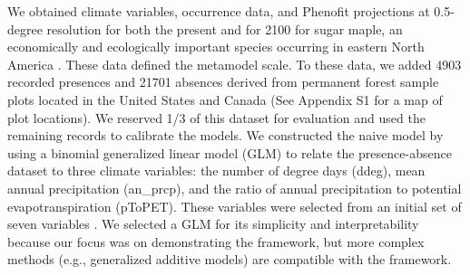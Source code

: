 \documentclass[11pt]{article}
\newcommand{\rev}[1]{{\color{RoyalBlue}#1}}
\begin{document}
We obtained climate variables, occurrence data, and Phenofit projections at 0.5-degree resolution for both the present and for \rev{2100} for sugar maple, an economically and ecologically important species occurring in eastern North America \citep{Morin2009}.
These data defined the metamodel scale.
To these data, we added 4903 recorded presences and 21701 absences derived from permanent forest sample plots located in the United States and Canada (See Appendix S1 for a map of plot locations).
We reserved 1/3 of this dataset for evaluation and used the remaining records to calibrate the models.
We constructed the naive model by using a binomial generalized linear model (GLM) to relate the presence-absence dataset to three climate variables: the number of degree days (ddeg), mean annual precipitation (an\_prcp), and the ratio of annual precipitation to potential evapotranspiration (pToPET).
These variables were selected from an initial set of \rev{seven} variables \citep[see Appendix S1 and ][for details on the climate variables]{Morin2009}.
We selected a GLM for its simplicity and interpretability because our focus was on demonstrating the framework, but more complex methods (e.g., generalized additive models) are compatible with the framework.
\end{document}
